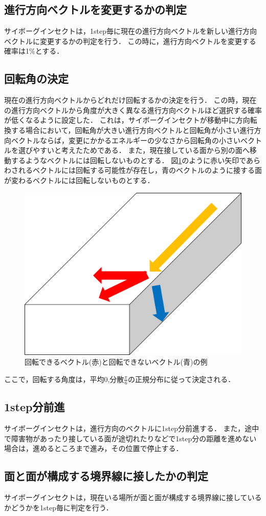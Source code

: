\documentclass[a4paper,11pt]{jarticle}
\begin{document}
	\subsection{進行方向ベクトルを変更するかの判定}
	\label{carb}
	サイボーグインセクトは，1step毎に現在の進行方向ベクトルを新しい進行方向ベクトルに変更するかの判定を行う．
	この時に，進行方向ベクトルを変更する確率は1\%とする．
	
	\subsection{回転角の決定}
	現在の進行方向ベクトルからどれだけ回転するかの決定を行う．
	この時，現在の進行方向ベクトルから角度が大きく異なる進行方向ベクトルほど選択する確率が低くなるように設定した．
	これは，サイボーグインセクトが移動中に方向転換する場合において，回転角が大きい進行方向ベクトルと回転角が小さい進行方向ベクトルならば，変更にかかるエネルギーの少なさから回転角の小さいベクトルを選びやすいと考えたためである．
	また，現在接している面から別の面へ移動するようなベクトルには回転しないものとする．
	図\ref{fig:bend}のように赤い矢印であらわされるベクトルには回転する可能性が存在し，青のベクトルのように接する面が変わるベクトルには回転しないものとする．
	\begin{figure}
		\centering
		\includegraphics[width=0.35\linewidth]{png/bend.png}
		\caption[ベクトルの決定]{回転できるベクトル(赤)と回転できないベクトル(青)の例}
		\label{fig:bend}
	\end{figure}
	
	ここで，回転する角度は，平均0,分散$\frac{\pi}{6}$の正規分布に従って決定される．
	
	\subsection{1step分前進}
	サイボーグインセクトは，進行方向のベクトルに1step分前進する．
	また，途中で障害物があったり接している面が途切れたりなどで1step分の距離を進めない場合は，進めるところまで進み，その位置で停止する．
	
	\subsection{面と面が構成する境界線に接したかの判定}
	サイボーグインセクトは，現在いる場所が面と面が構成する境界線に接しているかどうかを1step毎に判定を行う．
	
\end{document}
